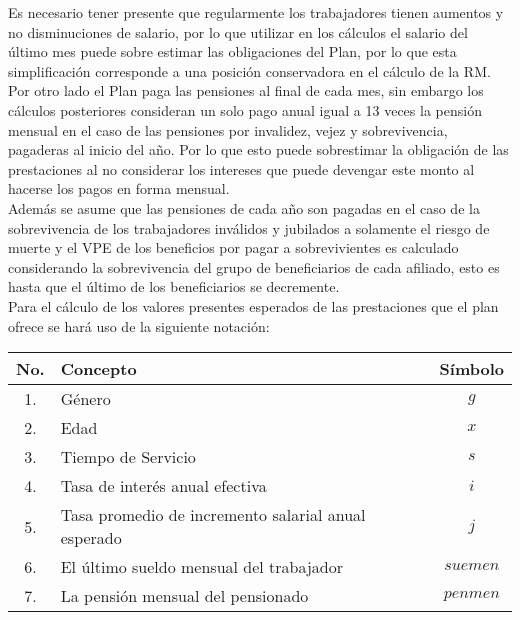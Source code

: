 \documentclass[12pt,letterpaper,titlepage]{article}
\begin{document}
{Es necesario tener presente que regularmente los trabajadores tienen aumentos y no disminuciones de salario, por lo que utilizar en los cálculos el salario del último mes puede sobre estimar las obligaciones del Plan, por lo que esta simplificación corresponde a una posición conservadora en el cálculo de la RM.\\

Por otro lado el Plan paga las pensiones al final de cada mes, sin embargo los cálculos posteriores consideran un solo pago anual igual a 13 veces la pensión mensual en el caso de las pensiones por invalidez, vejez y sobrevivencia, pagaderas al inicio del año. Por lo que esto puede sobrestimar la obligación de las prestaciones  al no considerar los intereses que puede devengar este monto al hacerse los pagos en forma mensual.\\

Además se asume que las pensiones de cada año son pagadas en el caso de la sobrevivencia de los trabajadores inválidos y jubilados a solamente el riesgo de muerte y el VPE de los beneficios por pagar a sobrevivientes es calculado considerando la sobrevivencia del grupo de beneficiarios de cada afiliado, esto es hasta que el último de los beneficiarios se decremente.\\

Para el cálculo de los valores presentes esperados de las prestaciones que el plan ofrece se hará uso de la siguiente notación:\\
\begin{center} %
	\begin{tabular}{|c||l||c|}
		\hline 
		\rule[-1ex]{0pt}{2.5ex} No. & Concepto & Símbolo \\  
		\hline 
		\hline
		\rule[-1ex]{0pt}{2.5ex} 1. &Género & $g$ \\ 
		\hline 
		\rule[-1ex]{0pt}{2.5ex} 2. & Edad & $x$ \\ 
		\hline 
		\rule[-1ex]{0pt}{2.5ex} 3. & Tiempo de Servicio & $s$ \\ 
		\hline 
		\rule[-1ex]{0pt}{2.5ex} 4. & Tasa de interés anual efectiva & $i$ \\ 
		\hline 
		\rule[-1ex]{0pt}{2.5ex} 5. & Tasa promedio de incremento salarial anual esperado & $j$ \\ 
		\hline 
		\rule[-1ex]{0pt}{2.5ex} 6. & El último sueldo mensual del trabajador & $suemen$ \\ 
		\hline 
		\rule[-1ex]{0pt}{2.5ex} 7. & La pensión mensual del pensionado & $penmen$ \\ 
		\hline 
	\end{tabular} 
\end{center}

}
\end{document}
